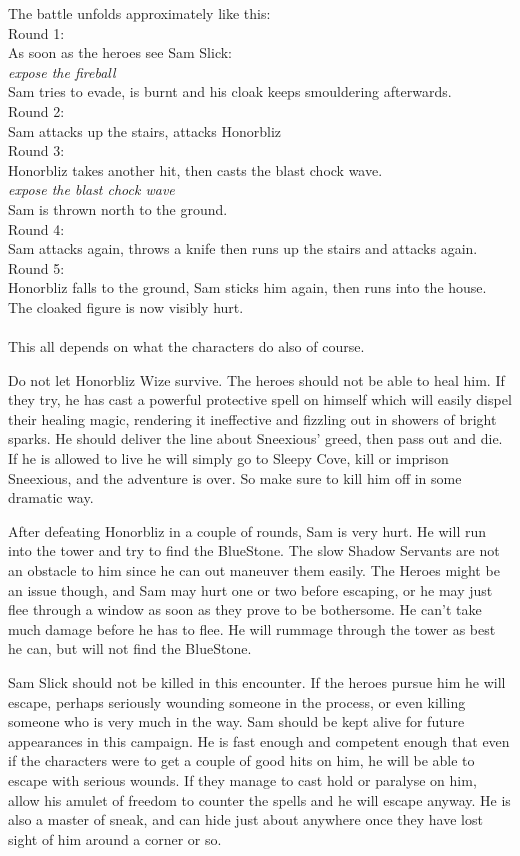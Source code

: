 The battle unfolds approximately like this: \\
Round 1: \\
As soon as the heroes see Sam Slick: \\
\emph{expose the fireball} \\
Sam tries to evade, is burnt and his cloak keeps smouldering afterwards. \\
Round 2: \\
Sam attacks up the stairs, attacks Honorbliz \\
Round 3: \\
Honorbliz takes another hit, then casts the blast chock wave. \\
\emph{expose the blast chock wave} \\
Sam is thrown north to the ground. \\
Round 4:  \\
Sam attacks again, throws a knife then runs up the stairs and attacks again. \\
Round 5: \\
Honorbliz falls to the ground, Sam sticks him again, then runs into the house. The cloaked figure is now visibly hurt. \\
\\
This all depends on what the characters do also of course.

Do not let Honorbliz Wize survive. The heroes should not be able to heal him. If they try, he has cast a powerful protective spell on himself which will easily dispel their healing magic, rendering it ineffective and fizzling out in showers of bright sparks. He should deliver the line about Sneexious' greed, then pass out and die.
If he is allowed to live he will simply go to Sleepy Cove, kill or imprison Sneexious, and the adventure is over. So make sure to kill him off in some dramatic way.

After defeating Honorbliz in a couple of rounds, Sam is very hurt. He will run into the tower and try to find the BlueStone. The slow Shadow Servants are not an obstacle to him since he can out maneuver them easily. The Heroes might be an issue though, and Sam may hurt one or two before escaping, or he may just flee through a window as soon as they prove to be bothersome. He can't take much damage before he has to flee. He will rummage through the tower as best he can, but will not find the BlueStone.

Sam Slick should not be killed in this encounter. If the heroes pursue him he will escape, perhaps seriously wounding someone in the process, or even killing someone who is very much in the way. Sam should be kept alive for future appearances in this campaign. He is fast enough and competent enough that even if the characters were to get a couple of good hits on him, he will be able to escape with serious wounds. If they manage to cast hold or paralyse on him, allow his amulet of freedom to counter the spells and he will escape anyway. He is also a master of sneak, and can hide just about anywhere once they have lost sight of him around a corner or so.


